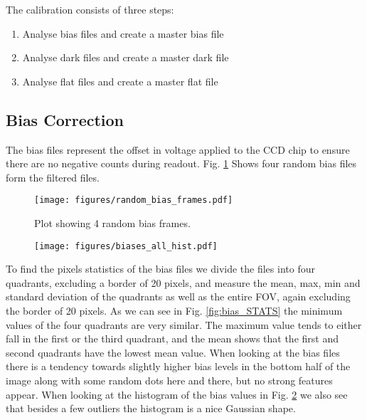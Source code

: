 \documentclass[twocolumn]{aastex631}
\begin{document}

The calibration consists of three steps: 
\begin{enumerate}
    \item Analyse bias files and create a master bias file
    \item Analyse dark files and create a master dark file
    \item Analyse flat files and create a master flat file
\end{enumerate}

\subsection{Bias Correction}
\label{subsec:bias}
The bias files represent the offset in voltage applied to the CCD chip to ensure there are no negative counts during readout. 
Fig. \ref{fig:random_bias} Shows four random bias files form the filtered files. 
\begin{figure}[ht!]
    \begin{centering}
        \texttt{[image: figures/random\_bias\_frames.pdf]}
        \caption{Plot showing 4 random bias frames.}
        \label{fig:random_bias}
    \end{centering}
\end{figure}


\begin{figure}[ht!]
    \begin{centering}
        \texttt{[image: figures/biases\_all\_hist.pdf]}
        \caption{}
        \label{fig:hist_all_bias}
    \end{centering}
\end{figure}


To find the pixels statistics of the bias files we divide the files into four quadrants, excluding a border of 20 pixels, and measure the mean, max, min and standard deviation of the quadrants as well as the entire FOV, again excluding the border of 20 pixels. As we can see in Fig. \ref{fig:bias_STATS} the minimum values of the four quadrants are very similar. The maximum value tends to either fall in the first or the third quadrant, and the mean shows that the first and second quadrants have the lowest mean value. When looking at the bias files there is a tendency towards slightly higher bias levels in the bottom half of the image along with some random dots here and there, but no strong features appear. When looking at the histogram of the bias values in Fig. \ref{fig:hist_all_bias} we also see that besides a few outliers the histogram is a nice Gaussian shape. 
\end{document}
